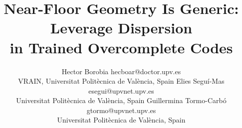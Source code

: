 \documentclass{article}
\title{Near-Floor Geometry Is Generic: Leverage Dispersion\\in Trained Overcomplete Codes}
\author{%
  \name Hector Borobia \email hecboar@doctor.upv.es \\
  \addr VRAIN, Universitat Polit\`ecnica de Val\`encia, Spain
  \AND
  \name Elies Segu\'i-Mas \email esegui@upvnet.upv.es \\
  \addr Universitat Polit\`ecnica de Val\`encia, Spain
  \AND
  \name Guillermina Tormo-Carb\'o \email gtormo@upvnet.upv.es \\
  \addr Universitat Polit\`ecnica de Val\`encia, Spain%
}
\theoremstyle{definition}
\begin{document}
\maketitle

\begin{abstract}

\end{abstract}




















\appendix















\end{document}
